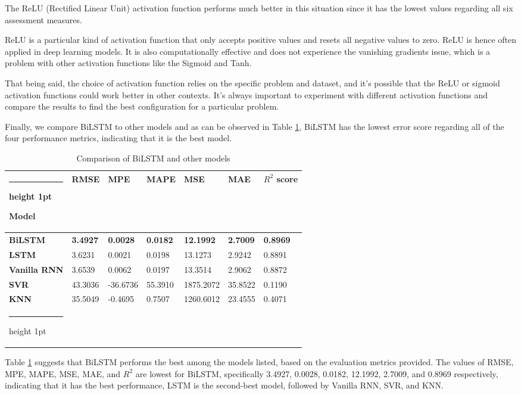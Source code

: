 \documentclass[a4paper]{article}
\makeatletter
\newcommand{\thickhline}{%
    \noalign {\ifnum 0=`}\fi \hrule height 1pt
    \futurelet \reserved@a \@xhline
}
\makeatother
\begin{document}
The ReLU (Rectified Linear Unit) activation function performs much better in this situation since it has the lowest values regarding all six assessment measures. 

ReLU is a particular kind of activation function that only accepts positive values and resets all negative values to zero. ReLU is hence often applied in deep learning models. It is also computationally effective and does not experience the vanishing gradients issue, which is a problem with other activation functions like the Sigmoid and Tanh.

That being said, the choice of activation function relies on the specific problem and dataset, and it's possible that the ReLU or sigmoid activation functions could work better in other contexts. It's always important to experiment with different activation functions and compare the results to find the best configuration for a particular problem.

Finally, we compare BiLSTM to other models and as can be observed in Table \ref{table:model}, BiLSTM has the lowest error score regarding all of the four performance metrics, indicating that it is the best model. 

\begin{table}[!h]
\centering
\caption{Comparison of BiLSTM and other models}
\label{table:model}
\vspace{5pt}
\begin{tabular}{lllllll}
\thickhline
\textbf{Model} & \textbf{RMSE} & \textbf{MPE} & \textbf{MAPE} & \textbf{MSE} &\textbf{ MAE} & \textbf{$R^2$ score} \\ 
\hline
\textbf{BiLSTM} & \textbf{3.4927} & \textbf{0.0028} & \textbf{0.0182} & \textbf{12.1992} & \textbf{2.7009} & \textbf{0.8969}\\
\hline
\textbf{LSTM} & 3.6231 & 0.0021 & 0.0198 & 13.1273 & 2.9242 & 0.8891 \\ 
\hline
\textbf{Vanilla RNN} & 3.6539 & 0.0062 & 0.0197 & 13.3514 & 2.9062 & 0.8872 \\
\hline
\textbf{SVR} & 43.3036 & -36.6736 & 55.3910 & 1875.2072 & 35.8522 & 0.1190 \\
\hline
\textbf{KNN} & 35.5049 & -0.4695 & 0.7507 & 1260.6012 & 23.4555 & 0.4071 \\
\thickhline
\end{tabular}
\end{table}

Table \ref{table:model} suggests that BiLSTM performs the best among the models listed, based on the evaluation metrics provided. The values of RMSE, MPE, MAPE, MSE, MAE, and $R^2$ are lowest for BiLSTM, specifically 3.4927, 0.0028, 0.0182, 12.1992, 2.7009, and 0.8969 respectively, indicating that it has the best performance, LSTM is the second-best model, followed by Vanilla RNN, SVR, and KNN.
\end{document}
